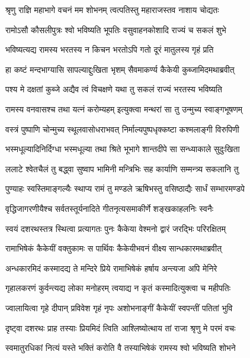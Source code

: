 \twolineshloka
{श्रृणु राज्ञि महाभागे वचनं मम शोभनम्}
{त्वत्पतिस्तु महाराजस्तव नाशाय चोद्यतः} %

\twolineshloka
{रामोऽसौ कौसलीपुत्रः श्वो भविष्यति भूपतिः}
{वसुवाहनकोशादि राज्यं च सकलं शुभे} %

\twolineshloka
{भविष्यत्यद्य रामस्य भरतस्य न किचन}
{भरतोऽपि गतो दूरं मातुलस्य गृहं प्रति} %

\twolineshloka
{हा कष्टं मन्दभाग्यासि सापल्याद्दुःखिता भृशम्}
{सैवमाकर्ण्य कैकेयी कुब्जामिदमथाब्रवीत्} %

\twolineshloka
{पश्य मे दक्षतां कुब्जे अद्यैव त्वं विचक्षणे}
{यथा तु सकलं राज्यं भरतस्य भविष्यति} %

\twolineshloka
{रामस्य वनवासश्च तथा यत्नं करोम्यहम्}
{इत्युक्त्वा मन्थरां सा तु उन्मुच्य स्वाङ्गभूषणम्} %

\twolineshloka
{वस्त्रं पुष्पाणि चोन्मुच्य स्थूलवासोधराभवत्}
{निर्माल्यपुष्पधृक्कष्टा कश्मलाङ्गी विरुपिणी} %

\twolineshloka
{भस्मधूल्यादिनिर्दिग्धा भस्मधूल्या तथा श्रिते}
{भूभागे शान्तदीपे सा सन्ध्याकाले सुदुःखिता} %

\twolineshloka
{ललाटे श्वेतचैलं तु बद्ध्वा सुष्वाप भामिनी}
{मन्त्रिभिः सह कार्याणि सम्मन्त्र्य सकलानि तु} %

\twolineshloka
{पुण्याहः स्वस्तिमाङ्गल्यैः स्थाप्य रामं तु मण्डले}
{ऋषिभस्तु वसिष्ठाद्यैः सार्धं सम्भारमण्डपे} %

\twolineshloka
{वृद्धिजागरणीयैश्च सर्वतस्तूर्यनादिते}
{गीतनृत्यसमाकीर्णे शङ्खकाहलनिः स्वनैः} %

\twolineshloka
{स्वयं दशरथस्तत्र स्थित्वा प्रत्यागतः पुनः}
{कैकेया वेश्मनो द्वारं जरद्भिः परिरक्षितम्} %

\twolineshloka
{रामाभिषेकं कैकेयीं वक्तुकामः स पार्थिवः}
{कैकेयीभवनं वीक्ष्य सान्धकारमथाब्रवीत्} %

\twolineshloka
{अन्धकारमिदं कस्मादद्य ते मन्दिरे प्रिये}
{रामाभिषेकं हर्षाय अन्त्यजा अपि मेनिरे} %

\twolineshloka
{गृहालकरणं कुर्वन्त्यद्य लोका मनोहरम्}
{त्वयाद्य न कृतं कस्मादित्युक्त्वा च महीपतिः} %

\twolineshloka
{ज्वालायित्वा गृहे दीपान् प्रविवेश गृहं नृपः}
{अशोभनाङ्गीं कैकेयीं स्वपन्तीं पतितां भुवि} %

\twolineshloka
{दृष्ट्वा दशरथः प्राह तस्याः प्रियमिदं त्विति}
{आश्लिष्योत्थाय तां राजा श्रृणु मे परमं वचः} %

\twolineshloka
{स्वमातुरधिकां नित्यं यस्ते भक्तिं करोति वै}
{तस्याभिषेकं रामस्य श्वो भविष्यति शोभने} %

